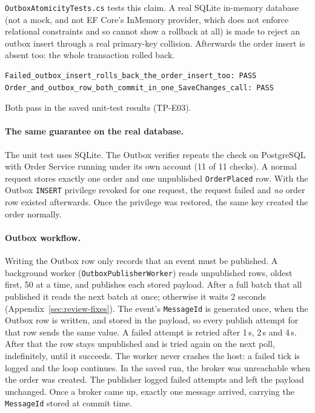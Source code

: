 \documentclass[a4paper]{report}
\begin{document}
\texttt{OutboxAtomicityTests.cs} tests
this claim. A real SQLite in-memory database (not a mock, and not EF Core's
InMemory provider, which does not enforce relational constraints and so cannot
show a rollback at all) is made to reject an outbox insert through a real
primary-key collision. Afterwards the order insert is absent too: the whole
transaction rolled back.

\begin{Verbatim}[breaklines=true,breakanywhere=true,fontsize=\footnotesize]
Failed_outbox_insert_rolls_back_the_order_insert_too: PASS
Order_and_outbox_row_both_commit_in_one_SaveChanges_call: PASS
\end{Verbatim}

Both pass in the saved unit-test results (TP-E03).

\paragraph{The same guarantee on the real database.} The unit test uses
SQLite. The Outbox verifier repeats the check on PostgreSQL with Order Service
running under its own account (11 of 11 checks). A normal
request stores exactly one order and one unpublished \texttt{OrderPlaced} row.
With the Outbox \texttt{INSERT} privilege revoked for one request, the request
failed and \emph{no} order row existed afterwards. Once the privilege was
restored, the same key created the order normally.

\paragraph{Outbox workflow.} Writing the Outbox row only records that an
event must be published. A background worker (\texttt{OutboxPublisherWorker})
reads unpublished rows, oldest first, 50 at a time, and publishes each stored
payload. After a full batch that all published it reads the next batch at
once; otherwise it waits 2 seconds (Appendix~\ref{sec:review-fixes}). The event's \texttt{MessageId} is generated
once, when the Outbox row is written, and stored in the payload, so every
publish attempt for that row sends the same value. A failed attempt is retried
after 1\,s, 2\,s and 4\,s. After that the row stays unpublished and is tried
again on the next poll, indefinitely, until it succeeds. The worker never
crashes the host: a failed tick is logged and the loop continues. In the saved
run, the broker was unreachable when the order was created. The publisher
logged failed attempts and left the payload unchanged. Once a broker came up,
exactly one message arrived, carrying the \texttt{MessageId} stored at commit
time.
\end{document}
